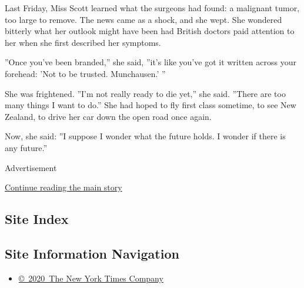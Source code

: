 Last Friday, Miss Scott learned what the surgeons had found: a malignant
tumor, too large to remove. The news came as a shock, and she wept. She
wondered bitterly what her outlook might have been had British doctors
paid attention to her when she first described her symptoms.

''Once you've been branded,'' she said, ''it's like you've got it
written across your forehead: 'Not to be trusted. Munchausen.' ''

She was frightened. ''I'm not really ready to die yet,'' she said.
''There are too many things I want to do.'' She had hoped to fly first
class sometime, to see New Zealand, to drive her car down the open road
once again.

Now, she said: ''I suppose I wonder what the future holds. I wonder if
there is any future.''

Advertisement

\protect\hyperlink{after-bottom}{Continue reading the main story}

\hypertarget{site-index}{%
\subsection{Site Index}\label{site-index}}

\hypertarget{site-information-navigation}{%
\subsection{Site Information
Navigation}\label{site-information-navigation}}

\begin{itemize}
\tightlist
\item
  \href{https://help.nytimes.com/hc/en-us/articles/115014792127-Copyright-notice}{©~2020~The
  New York Times Company}
\end{itemize}


